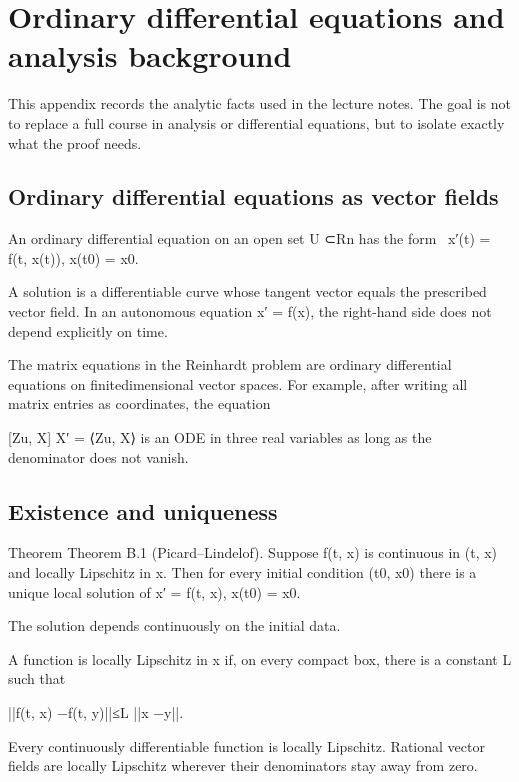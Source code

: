 \chapter{Ordinary differential equations and analysis background}
This appendix records the analytic facts used in the lecture notes. The goal is not to replace a full course in analysis or differential equations, but to isolate exactly what the proof needs.


\section{Ordinary differential equations as vector fields}

\begin{displaytext}
An ordinary differential equation on an open set U ⊂Rn has the form \
x′(t) = f(t, x(t)), x(t0) = x0.
\end{displaytext}

A solution is a differentiable curve whose tangent vector equals the prescribed vector field. In an autonomous equation x′ = f(x), the right-hand side does not depend explicitly on time.


The matrix equations in the Reinhardt problem are ordinary differential equations on finitedimensional vector spaces. For example, after writing all matrix entries as coordinates, the equation


[Zu, X] X′ = ⟨Zu, X⟩ is an ODE in three real variables as long as the denominator does not vanish.


\section{Existence and uniqueness}

\begin{statementbox}{Theorem}
Theorem B.1 (Picard–Lindelof). Suppose f(t, x) is continuous in (t, x) and locally Lipschitz in x. Then for every initial condition (t0, x0) there is a unique local solution of x′ = f(t, x), x(t0) = x0.
\end{statementbox}

The solution depends continuously on the initial data.


A function is locally Lipschitz in x if, on every compact box, there is a constant L such that


||f(t, x) −f(t, y)||≤L ||x −y||.


Every continuously differentiable function is locally Lipschitz. Rational vector fields are locally Lipschitz wherever their denominators stay away from zero.



